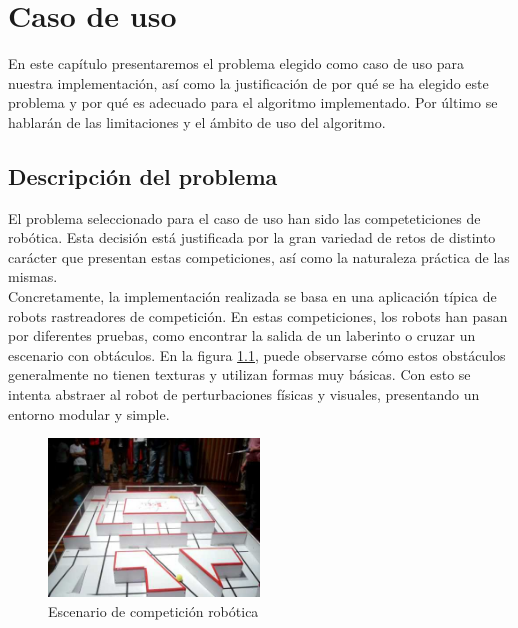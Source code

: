 \chapter{Caso de uso}
\label{caso_de_uso}

En este capítulo presentaremos el problema elegido como caso de uso para nuestra implementación, así como la justificación de por qué se ha elegido este problema y por qué es adecuado para el algoritmo implementado. Por último se hablarán de las limitaciones y el ámbito de uso del algoritmo.\\


\section{Descripción del problema}
\label{problema}

El problema seleccionado para el caso de uso han sido las competeticiones de robótica. Esta decisión está justificada por la gran variedad de retos de distinto carácter que presentan estas competiciones, así como la naturaleza práctica de las mismas.\\

Concretamente, la implementación realizada se basa en una aplicación típica de robots rastreadores de competición. En estas competiciones, los robots han pasan por diferentes pruebas, como encontrar la salida de un laberinto o cruzar un escenario con obtáculos. En la figura \ref{fig:competi1}, puede observarse cómo estos obstáculos generalmente no tienen texturas y utilizan formas muy básicas. Con esto se intenta abstraer al robot de perturbaciones físicas y visuales, presentando un entorno modular y simple.\\

\begin{figure}[h]
		\centering
        \includegraphics[width=0.5\textwidth]{images/competi1.jpg}
        \caption{Escenario de competición robótica}
        \label{fig:competi1}
\end{figure}  

